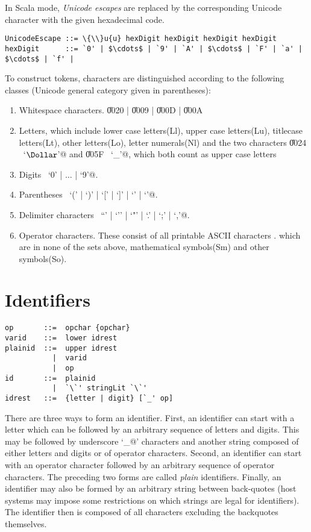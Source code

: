 In Scala mode, \textit{Unicode escapes} are replaced by the corresponding
Unicode character with the given hexadecimal code.
\begin{lstlisting}
UnicodeEscape ::= \{\\}u{u} hexDigit hexDigit hexDigit hexDigit
hexDigit      ::= `0' | $\cdots$ | `9' | `A' | $\cdots$ | `F' | `a' | $\cdots$ | `f' |
\end{lstlisting}
To construct tokens, characters are distinguished according to the following classes 
(Unicode general category given in parentheses):
\begin{enumerate}
\item Whitespace characters. \U{0020} | \U{0009} | \U{000D} | \U{000A}
\item Letters, which include lower case letters(Ll), upper case letters(Lu), titlecase letters(Lt), other letters(Lo), letter numerals(Nl) and the 
two characters \U{0024} ~\lstinline@`$\Dollar$'@ and \U{005F} ~\lstinline@`_'@, which
both count as upper case letters
\item Digits ~\lstinline@`0' | $\ldots$ | `9'@.
\item Parentheses ~\lstinline@`(' | `)' | `[' | `]' | `{' | `}'@.
\item Delimiter characters ~\lstinline@``' | `'' | `"' | `.' | `;' | `,'@.
\item Operator characters. These consist of all printable ASCII characters . 
which are in none of the sets above, mathematical symbols(Sm) and other symbols(So).
\end{enumerate}
\newpage
\section{Identifiers}\label{sec:idents}

\syntax\begin{lstlisting}
op       ::=  opchar {opchar} 
varid    ::=  lower idrest
plainid  ::=  upper idrest
           |  varid
           |  op
id       ::=  plainid
           |  `\`' stringLit `\`'
idrest   ::=  {letter | digit} [`_' op]
\end{lstlisting}

There are three ways to form an identifier. First, an identifier can
start with a letter which can be followed by an arbitrary sequence of
letters and digits. This may be followed by underscore `\lstinline@_@'
characters and another string composed of either letters and digits or
of operator characters.  Second, an identifier can start with an operator 
character followed by an arbitrary sequence of operator characters.
The preceding two forms are called {\em plain} identifiers.  Finally,
an identifier may also be formed by an arbitrary string between
back-quotes (host systems may impose some restrictions on which
strings are legal for identifiers).  The identifier then is composed
of all characters excluding the backquotes themselves.
 
